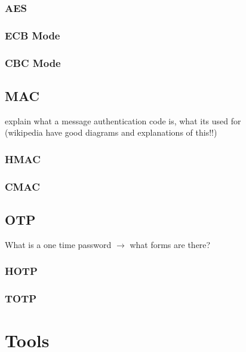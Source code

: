 \documentclass[bsc,frontabs,twoside,singlespacing,parskip,deptreport]{infthesis}     %
\begin{document}
\subsection{AES}

\subsection{ECB Mode}
\subsection{CBC Mode}


\section{MAC}

\noindent explain what a message authentication code is, what its used for\\
\noindent (wikipedia have good diagrams and explanations of this!!)

\subsection{HMAC}
\subsection{CMAC}

\section{OTP}

\noindent What is a one time password $\rightarrow$ what forms are there?

\subsection{HOTP}
\subsection{TOTP}





\chapter{Tools}
\end{document}
